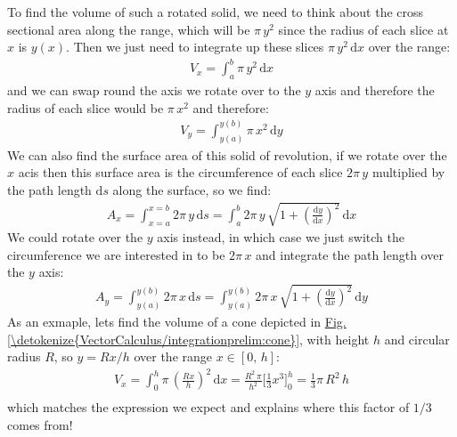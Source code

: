 \documentclass[letterpaper,10pt,english]{jupyterBook}
\begin{document}
\sphinxAtStartPar
To find the volume of such a rotated solid, we need to think about the cross sectional area along the range, which will be \(\pi \,y^2\) since the
radius of each slice at \(x\) is \(y(x)\).  Then we just need to integrate up these slices \(\pi\,y^2\,\mathrm{d}x\) over the range:
\begin{equation*}
\begin{split}V_x = \int_a^b \pi\,y^2\,\mathrm{d}x\end{split}
\end{equation*}
\sphinxAtStartPar
and we can swap round the axis we rotate over to the \(y\) axis and therefore the radius of each slice would be \(\pi\,x^2\) and therefore:
\begin{equation*}
\begin{split}V_y = \int_{y(a)}^{y(b)} \pi\,x^2\,\mathrm{d}y\end{split}
\end{equation*}
\sphinxAtStartPar
We can also find the surface area of this solid of revolution, if we rotate over the \(x\) acis then this surface area is the circumference of each
slice \(2\pi\,y\) multiplied by the path length \(\mathrm{d} s\) along the surface, so we find:
\begin{equation*}
\begin{split}A_x = \int_{x=a}^{x=b} 2\pi\,y\,\mathrm{d}s = \int_a^b 2\pi\,y\,\sqrt{1 + \left(\frac{\mathrm{d}y}{\mathrm{d}x}\right)^2}\,\mathrm{d}x\end{split}
\end{equation*}
\sphinxAtStartPar
We could rotate over the \(y\) axis instead, in which case we just switch the circumference we are interested in to be \(2\pi\,x\) and integrate the
path length over the \(y\) axis:
\begin{equation*}
\begin{split}A_y = \int_{y(a)}^{y(b)} 2\pi\,x\,\mathrm{d}s = \int_{y(a)}^{y(b)} 2\pi\,x\,\sqrt{1 + \left(\frac{\mathrm{d}y}{\mathrm{d}x}\right)^2}\,\mathrm{d}y\end{split}
\end{equation*}
\sphinxAtStartPar
As an exmaple, lets find the volume of a cone depicted in \hyperref[\detokenize{VectorCalculus/integrationprelim:cone}]{Fig.\@ \ref{\detokenize{VectorCalculus/integrationprelim:cone}}}, with height \(h\) and circular radius \(R\), so \(y = R x / h\) over the range \(x \in [0,\, h]\):
\begin{equation*}
\begin{split}V_x = \int_0^h \pi\,\left(\frac{R x}{h}\right)^2\,\mathrm{d}x = \frac{R^2 \,\pi}{h^2}\Big[ \frac{1}{3}x^3\Big]_0^h = \frac{1}{3}\pi \,R^2\,h\\\end{split}
\end{equation*}
\sphinxAtStartPar
which matches the expression we expect and explains where this factor of \(1/3\) comes from!
\end{document}
